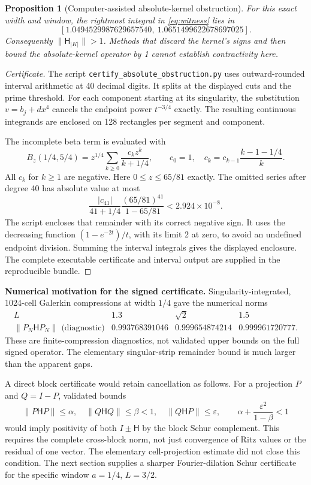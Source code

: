 \documentclass[11pt,letterpaper]{article}
\newtheorem{proposition}[theorem]{Proposition}
\begin{document}
\begin{proposition}[Computer-assisted absolute-kernel obstruction]
For this exact width and window, the rightmost integral in \eqref{eq:witness} lies in
\[
 [1.0494529987629657540,\ 1.0651499622678697025].
\]
Consequently $\|\mathsf H_{|K|}\|>1$. Methods that discard the kernel's signs and then bound the absolute-kernel operator by 1 cannot establish contractivity here.
\end{proposition}
\begin{proof}[Certificate]
The script \texttt{certify\_absolute\_obstruction.py} uses outward-rounded interval arithmetic at 40 decimal digits. It splits at the displayed cuts and the prime threshold. For each component starting at its singularity, the substitution $v=b_j+d x^4$ cancels the endpoint power $t^{-3/4}$ exactly. The resulting continuous integrands are enclosed on 128 rectangles per segment and component.

The incomplete beta term is evaluated with
\[
 B_z(1/4,5/4)=z^{1/4}\sum_{k\geq0}\frac{c_kz^k}{k+1/4},\qquad
 c_0=1,\quad c_k=c_{k-1}\frac{k-1-1/4}{k}.
\]
All $c_k$ for $k\geq1$ are negative. Here $0\leq z\leq65/81$ exactly. The omitted series after degree 40 has absolute value at most
\[
 \frac{|c_{41}|}{41+1/4}\frac{(65/81)^{41}}{1-65/81}
 <2.924\times10^{-8}.
\]
The script encloses that remainder with its correct negative sign. It uses the decreasing function $(1-e^{-2t})/t$, with its limit 2 at zero, to avoid an undefined endpoint division. Summing the interval integrals gives the displayed enclosure. The complete executable certificate and interval output are supplied in the reproducible bundle.
\end{proof}

\textbf{Numerical motivation for the signed certificate.} Singularity-integrated, 1024-cell Galerkin compressions at width $1/4$ gave the numerical norms
\[
 \begin{array}{c|ccc}
 L&1.3&\sqrt2&1.5\\\hline
 \|P_N\mathsf H P_N\|\text{ (diagnostic)}
 &0.993768391046&0.999654874214&0.999961720777.
 \end{array}
\]
These are finite-compression diagnostics, not validated upper bounds on the full signed operator. The elementary singular-strip remainder bound is much larger than the apparent gaps.

A direct block certificate would retain cancellation as follows. For a projection $P$ and $Q=I-P$, validated bounds
\[
 \|P\mathsf H P\|\leq\alpha,\quad
 \|Q\mathsf H Q\|\leq\beta<1,\quad
 \|Q\mathsf H P\|\leq\varepsilon,\qquad
 \alpha+\frac{\varepsilon^2}{1-\beta}<1
\]
would imply positivity of both $I\pm\mathsf H$ by the block Schur complement. This requires the complete cross-block norm, not just convergence of Ritz values or the residual of one vector. The elementary cell-projection estimate did not close this condition. The next section supplies a sharper Fourier-dilation Schur certificate for the specific window $a=1/4$, $L=3/2$.
\end{document}

